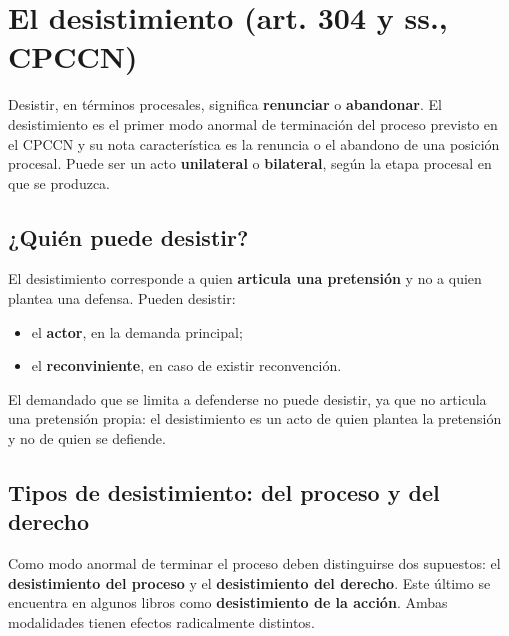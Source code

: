 \documentclass[12pt,oneside]{book}
\begin{document}
\section{El desistimiento (art. 304 y ss., CPCCN)}

Desistir, en términos procesales, significa \textbf{renunciar} o \textbf{abandonar}. %
El desistimiento es el primer modo anormal de terminación del proceso previsto en el CPCCN y su nota característica es la renuncia o el abandono de una posición procesal. Puede ser un acto \textbf{unilateral} o \textbf{bilateral}, según la etapa procesal en que se produzca.

\subsection{¿Quién puede desistir?}

El desistimiento corresponde a quien \textbf{articula una pretensión} y no a quien plantea una defensa. Pueden desistir:

\begin{itemize}
    \item el \textbf{actor}, en la demanda principal;
    \item el \textbf{reconviniente}, en caso de existir reconvención.
\end{itemize}

El demandado que se limita a defenderse no puede desistir, ya que no articula una pretensión propia: el desistimiento es un acto de quien plantea la pretensión y no de quien se defiende.

\subsection{Tipos de desistimiento: del proceso y del derecho}

Como modo anormal de terminar el proceso deben distinguirse dos supuestos: el \textbf{desistimiento del proceso} y el \textbf{desistimiento del derecho}. Este último se encuentra en algunos libros como \textbf{desistimiento de la acción}. Ambas modalidades tienen efectos radicalmente distintos.
\end{document}
